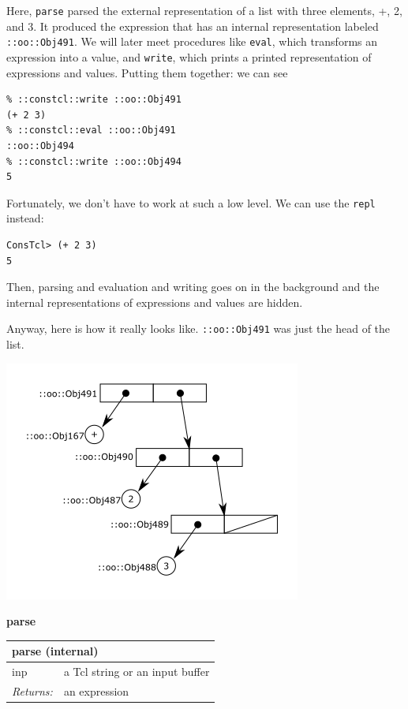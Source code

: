 \documentclass[twoside,9pt]{report}
\begin{document}
Here, \texttt{parse} parsed the external representation of a list with three elements, +, 2, and 3. It produced the expression that has an internal representation labeled \texttt{::oo::Obj491}. We will later meet procedures like \texttt{eval}, which transforms an expression into a value, and \texttt{write}, which prints a printed representation of expressions and values. Putting them together: we can see

\noindent\makebox[\linewidth]{\rule{\linewidth}{0.4pt}}
\begin{lstlisting}
% ::constcl::write ::oo::Obj491
(+ 2 3)
% ::constcl::eval ::oo::Obj491
::oo::Obj494
% ::constcl::write ::oo::Obj494
5
\end{lstlisting}
\noindent\makebox[\linewidth]{\rule{\linewidth}{0.4pt}}

Fortunately, we don't have to work at such a low level. We can use the \texttt{repl} instead:

\noindent\makebox[\linewidth]{\rule{\linewidth}{0.4pt}}
\begin{lstlisting}
ConsTcl> (+ 2 3)
5
\end{lstlisting}
\noindent\makebox[\linewidth]{\rule{\linewidth}{0.4pt}}

Then, parsing and evaluation and writing goes on in the background and the internal representations of expressions and values are hidden.


Anyway, here is how it really looks like. \texttt{::oo::Obj491} was just the head of the list.


\includegraphics{images/intreplist.png}


\textbf{parse}

\begin{tabular}{ |l l| }
\hline
\multicolumn{2}{|l|}{parse (internal)} \\
\hline
inp & a Tcl string or an input buffer \\
\textit{Returns:} & an expression \\
\hline
\end{tabular}
\end{document}
